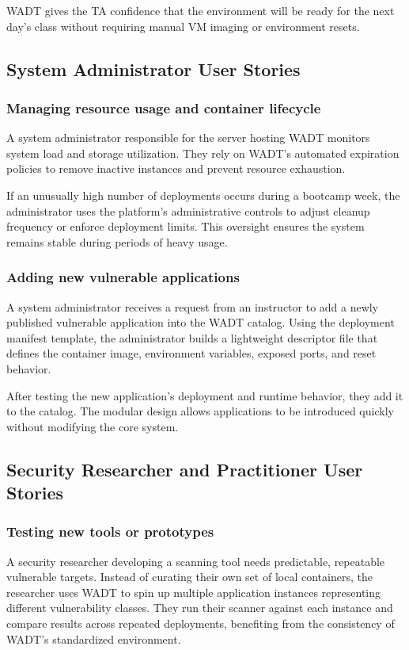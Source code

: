 \documentclass[12pt,titlepage]{article}
\begin{document}
WADT gives the TA confidence that the environment will be ready for the next day’s class without requiring manual VM imaging or environment resets.

\subsection{System Administrator User Stories}

\subsubsection*{Managing resource usage and container lifecycle}
A system administrator responsible for the server hosting WADT monitors system load and storage utilization. They rely on WADT’s automated expiration policies to remove inactive instances and prevent resource exhaustion.

If an unusually high number of deployments occurs during a bootcamp week, the administrator uses the platform’s administrative controls to adjust cleanup frequency or enforce deployment limits. This oversight ensures the system remains stable during periods of heavy usage.

\subsubsection*{Adding new vulnerable applications}
A system administrator receives a request from an instructor to add a newly published vulnerable application into the WADT catalog. Using the deployment manifest template, the administrator builds a lightweight descriptor file that defines the container image, environment variables, exposed ports, and reset behavior.

After testing the new application’s deployment and runtime behavior, they add it to the catalog. The modular design allows applications to be introduced quickly without modifying the core system.

\subsection{Security Researcher and Practitioner User Stories}

\subsubsection*{Testing new tools or prototypes}
A security researcher developing a scanning tool needs predictable, repeatable vulnerable targets. Instead of curating their own set of local containers, the researcher uses WADT to spin up multiple application instances representing different vulnerability classes. They run their scanner against each instance and compare results across repeated deployments, benefiting from the consistency of WADT’s standardized environment.
\end{document}

